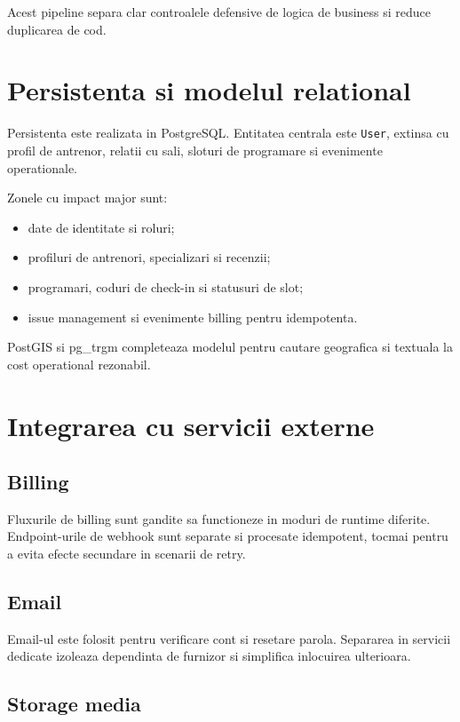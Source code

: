 Acest pipeline separa clar controalele defensive de logica de business si reduce duplicarea de cod.

\section{Persistenta si modelul relational}

Persistenta este realizata in PostgreSQL. Entitatea centrala este \texttt{User}, extinsa cu profil de antrenor, relatii cu sali, sloturi de programare si evenimente operationale.

Zonele cu impact major sunt:
\begin{itemize}[leftmargin=1.2cm]
    \item date de identitate si roluri;
    \item profiluri de antrenori, specializari si recenzii;
    \item programari, coduri de check-in si statusuri de slot;
    \item issue management si evenimente billing pentru idempotenta.
\end{itemize}

PostGIS si pg\_trgm completeaza modelul pentru cautare geografica si textuala la cost operational rezonabil.

\section{Integrarea cu servicii externe}

\subsection{Billing}

Fluxurile de billing sunt gandite sa functioneze in moduri de runtime diferite. Endpoint-urile de webhook sunt separate si procesate idempotent, tocmai pentru a evita efecte secundare in scenarii de retry.

\subsection{Email}

Email-ul este folosit pentru verificare cont si resetare parola. Separarea in servicii dedicate izoleaza dependinta de furnizor si simplifica inlocuirea ulterioara.

\subsection{Storage media}

